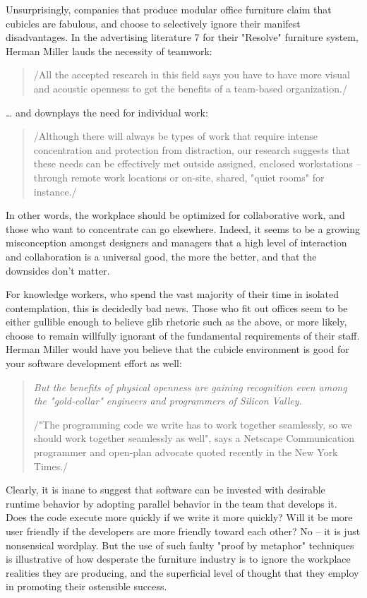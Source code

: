 \documentclass{article}
\begin{document}
\begin{enumerate}
Unsurprisingly, companies that produce modular office furniture claim
that cubicles are fabulous, and choose to selectively ignore their
manifest disadvantages. In the advertising literature 7 for their
"Resolve" furniture system, Herman Miller lauds the necessity of
teamwork:

\begin{quote}
/All the accepted research in this field says you have to have more
visual and acoustic openness to get the benefits of a team-based
organization./
\end{quote}

\ldots{} and downplays the need for individual work:

\begin{quote}
/Although there will always be types of work that require intense
concentration and protection from distraction, our research suggests
that these needs can be effectively met outside assigned, enclosed
workstations -- through remote work locations or on-site, shared,
"quiet rooms" for instance./
\end{quote}

In other words, the workplace should be optimized for collaborative
work, and those who want to concentrate can go elsewhere. Indeed, it
seems to be a growing misconception amongst designers and managers that
a high level of interaction and collaboration is a universal good, the
more the better, and that the downsides don't matter.

For knowledge workers, who spend the vast majority of their time in
isolated contemplation, this is decidedly bad news. Those who fit out
offices seem to be either gullible enough to believe glib rhetoric such
as the above, or more likely, choose to remain willfully ignorant of the
fundamental requirements of their staff. Herman Miller would have you
believe that the cubicle environment is good for your software
development effort as well:

\begin{quote}
\emph{But the benefits of physical openness are gaining recognition even
among the "gold-collar" engineers and programmers of Silicon Valley.}

/"The programming code we write has to work together seamlessly, so we
should work together seamlessly as well", says a Netscape
Communication programmer and open-plan advocate quoted recently in the
New York Times./
\end{quote}

Clearly, it is inane to suggest that software can be invested with
desirable runtime behavior by adopting parallel behavior in the team
that develops it. Does the code execute more quickly if we write it more
quickly? Will it be more user friendly if the developers are more
friendly toward each other? No -- it is just nonsensical wordplay. But
the use of such faulty "proof by metaphor" techniques is illustrative of
how desperate the furniture industry is to ignore the workplace
realities they are producing, and the superficial level of thought that
they employ in promoting their ostensible success.


\end{enumerate}
\end{document}
